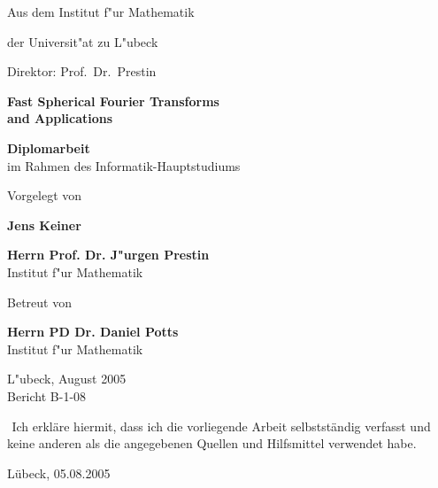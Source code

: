 \documentclass[a4paper,12pt]{article}
\begin{document}
\thispagestyle{empty}
\hoffset-1.2cm
\vspace{2cm}
\begin{center}
Aus dem Institut f"ur Mathematik

der Universit"at zu L"ubeck

Direktor: Prof.\ Dr.\  Prestin

\vspace{2cm}

{\Large {\bf Fast Spherical Fourier Transforms \\ and Applications}}

\medskip


\vspace{1.5cm}

{\bf Diplomarbeit}\\ im Rahmen des Informatik-Hauptstudiums\\

\vspace{3cm}

Vorgelegt von
 
{\bf Jens Keiner}

\vspace{1.5cm}

{\bf Herrn Prof. Dr. J"urgen Prestin}\\Institut f"ur Mathematik



\vspace{5mm}
Betreut von 

{\bf Herrn PD Dr. Daniel Potts}
    \\Institut f"ur Mathematik

\vspace{1cm}
L"ubeck, August 2005\\
Bericht B-1-08
\end{center}

\newpage
${}^{}$
\vfill
\noindent
Ich erkl\"are hiermit, dass ich die vorliegende Arbeit selbstst\"andig verfasst und keine anderen als die angegebenen Quellen und Hilfsmittel verwendet habe.
\begin{flushright}
  L\"ubeck, 05.08.2005
\end{flushright}
\thispagestyle{empty}
\end{document}
